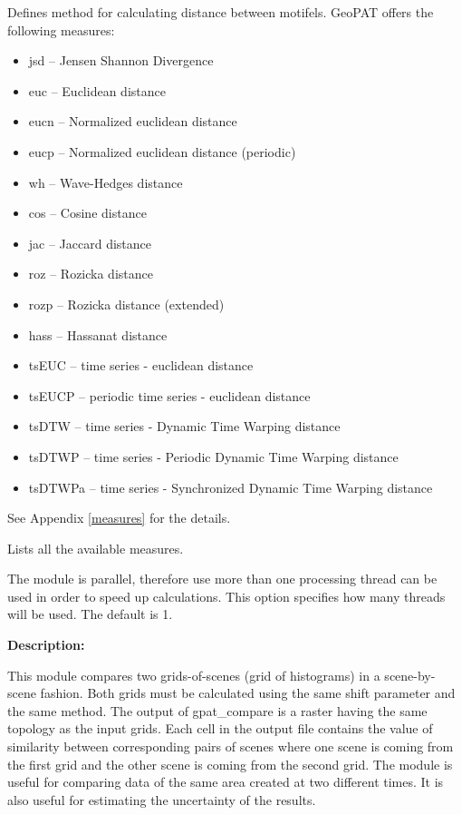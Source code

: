 Defines method for calculating distance between motifels. 
GeoPAT offers the following measures: 
\begin{itemize}
	\item jsd -- Jensen Shannon Divergence
	\item euc -- Euclidean distance
	\item eucn -- Normalized euclidean distance
	\item eucp -- Normalized euclidean distance (periodic)
	\item wh -- Wave-Hedges distance
	\item cos -- Cosine distance
	\item jac -- Jaccard distance
	\item roz -- Rozicka distance
	\item rozp -- Rozicka distance (extended)
	\item hass -- Hassanat distance
	\item tsEUC -- time series - euclidean distance
	\item tsEUCP -- periodic time series - euclidean distance
	\item tsDTW -- time series - Dynamic Time Warping distance
	\item tsDTWP -- time series - Periodic Dynamic Time Warping distance
	\item tsDTWPa -- time series - Synchronized Dynamic Time Warping distance
\end{itemize}
See Appendix \ref{measures} for the details.


Lists all the available measures.


The module is parallel, therefore use more than one processing thread can be used in order to speed up calculations. 
This option specifies how many threads will be used. 
The default is 1.

{\bf Description:}

This module compares two grids-of-scenes (grid of histograms) in a scene-by-scene fashion. 
Both grids must be calculated using the same shift parameter and the same method.
The output of gpat\_compare is a raster having the same topology as the input grids.
Each cell in the output file contains the value of similarity between corresponding pairs of scenes where one scene is coming from the first grid and the other scene is coming from the second grid.
The module is useful for comparing data of the same area created at two different times.
It is also useful for estimating the uncertainty of the results.

